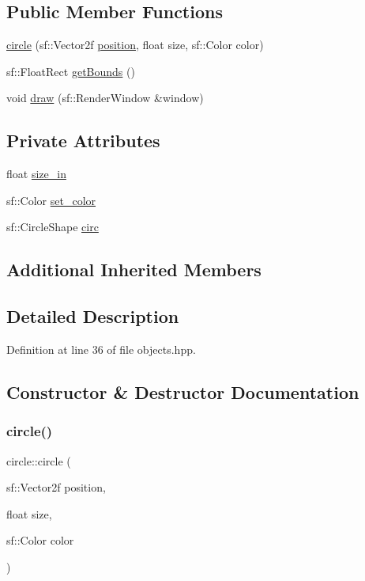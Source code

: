 \subsection*{Public Member Functions}
\begin{DoxyCompactItemize}
\item 
\hyperlink{classcircle_a9ebace5a33bb9ab0487d0d1bc7ece817}{circle} (sf\+::\+Vector2f \hyperlink{classfigure_a2196c51490b69027860fdb015913de19}{position}, float size, sf\+::\+Color color)
\item 
sf\+::\+Float\+Rect \hyperlink{classcircle_a8e0193c47ce75d0aed9b3501dbdd0499}{get\+Bounds} ()
\item 
void \hyperlink{classcircle_a49a37a81d863f524935be5953142886a}{draw} (sf\+::\+Render\+Window \&window)
\end{DoxyCompactItemize}
\subsection*{Private Attributes}
\begin{DoxyCompactItemize}
\item 
float \hyperlink{classcircle_ae45f54eec971ae74e4d8842300fa4d20}{size\+\_\+in}
\item 
sf\+::\+Color \hyperlink{classcircle_a5799c9f87886fe5c27a4386a491b54ea}{set\+\_\+color}
\item 
sf\+::\+Circle\+Shape \hyperlink{classcircle_a4b47ebebaf7c404bf7f644e8a96df46a}{circ}
\end{DoxyCompactItemize}
\subsection*{Additional Inherited Members}


\subsection{Detailed Description}


Definition at line 36 of file objects.\+hpp.



\subsection{Constructor \& Destructor Documentation}
\mbox{\label{classcircle_a9ebace5a33bb9ab0487d0d1bc7ece817}} 
\subsubsection{\texorpdfstring{circle()}{circle()}}
{\footnotesize\ttfamily circle\+::circle (\begin{DoxyParamCaption}\item[{sf\+::\+Vector2f}]{position,  }\item[{float}]{size,  }\item[{sf\+::\+Color}]{color }\end{DoxyParamCaption})}



